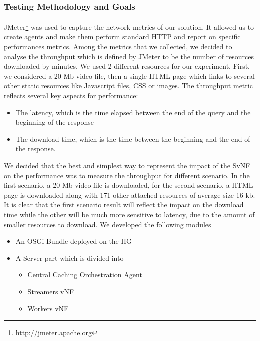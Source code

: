   \subsubsection{Testing Methodology and Goals}
JMeter\footnote{http://jmeter.apache.org} was used to capture the network metrics of our solution.
It allowed us to create agents and make them perform standard HTTP and report on specific performances metrics.    
Among the metrics that we collected, we decided to analyse the throughput which is defined by JMeter to be the number of resources downloaded by minutes.
We used 2 different resources for our experiment.
First, we considered a 20 Mb video file, then a single HTML page which links to several other static resources like Javascript files, CSS or images. 
   The throughput metric reflects several key aspects for performance:
   \begin{itemize}
   \item The latency, which is the time elapsed between the end of the query and the beginning of the response
	\item The download time, which is the time between the beginning and the end of the response.
   \end{itemize}
We decided that the best and simplest way to represent the impact of the SvNF on the performance was to measure the throughput for different scenario. In the first scenario, a 20 Mb video file is downloaded, for the second scenario, a HTML page is downloaded along with 171 other attached resources of average size 16 kb. It is clear that the first scenario result will reflect the impact on the download time while the other will be much more sensitive to latency, due to the amount of smaller resources to download.
We developed the following modules
\begin{itemize}
\item An OSGi Bundle deployed on the HG
\item A Server part which is divided into 
\begin{itemize}
\item Central Caching Orchestration Agent
\item Streamers vNF
\item Workers vNF
\end{itemize}

\end{itemize}	




